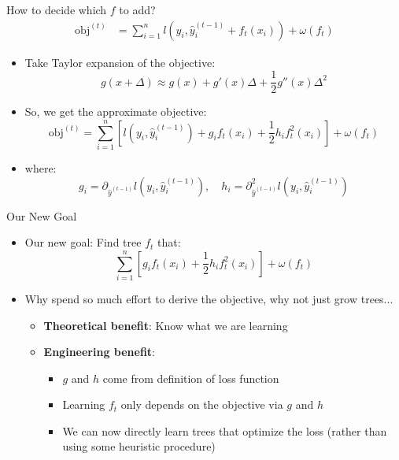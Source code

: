 \begin{frame}{How to decide which \( f \) to add?}
\begin{align*}
    \text{obj}^{(t)} &= \sum_{i=1}^{n} l\left(y_i, \hat{y}_i^{(t-1)} + f_t(x_i)\right) + \omega(f_t)
\end{align*}

\begin{itemize}
    \item Take Taylor expansion of the objective:
    \[
        g(x + \Delta) \approx g(x) + g'(x)\Delta + \frac{1}{2} g''(x)\Delta^2
    \]

    \item So, we get the approximate objective:
    \[
        \text{obj}^{(t)} = \sum_{i=1}^{n} \left[l(y_i, \hat{y}_i^{(t-1)}) + g_i f_t(x_i) + \frac{1}{2} h_i f_t^2(x_i)\right] + \omega(f_t)
    \]

    \item where:
    \[
        g_i = \partial_{\hat{y}^{(t-1)}} l(y_i, \hat{y}_i^{(t-1)}), \quad h_i = \partial_{\hat{y}^{(t-1)}}^2 l(y_i, \hat{y}_i^{(t-1)})
    \]
\end{itemize}
\end{frame}

\begin{frame}{Our New Goal}
\begin{itemize}
    \item Our new goal: Find tree \( f_t \) that:
    \[
        \sum_{i=1}^{n} \left[ g_i f_t(x_i) + \frac{1}{2} h_i f_t^2(x_i) \right] + \omega(f_t)
    \]

    \item Why spend so much effort to derive the objective, why not just grow trees...
    \begin{itemize}
        \item \textbf{Theoretical benefit}: Know what we are learning
        \item \textbf{Engineering benefit}:
        \begin{itemize}
            \item \( g \) and \( h \) come from definition of loss function
            \item Learning \( f_t \) only depends on the objective via \( g \) and \( h \)
            \item We can now directly learn trees that optimize the loss (rather than using some heuristic procedure)
        \end{itemize}
    \end{itemize}
\end{itemize}
\end{frame}

